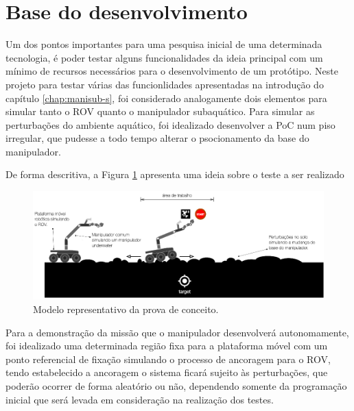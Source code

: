 \section{Base do desenvolvimento}
\label{sec:bod-s}
Um dos pontos importantes para uma pesquisa inicial de uma determinada tecnologia, é poder testar alguns funcionalidades da ideia principal com um mínimo de recursos necessários para o desenvolvimento de um protótipo. Neste projeto para testar várias das funcionlidades apresentadas na introdução do capítulo \ref{chap:manisub-s}, foi considerado analogamente dois elementos para simular tanto o ROV quanto o manipulador subaquático. Para simular as perturbações do ambiente aquático, foi idealizado desenvolver a PoC num piso irregular, que pudesse a todo tempo alterar o psocionamento da base do manipulador.

De forma descritiva, a Figura \ref{fig:manipoc} apresenta uma ideia sobre o teste a ser realizado

\begin{figure}[H] 
  \begin{center} 
  	\includegraphics[width=1 \textwidth]{images/ManiSub_PoC.png} 
  \end{center} 
  \caption{Modelo representativo da prova de conceito.} 
  \label{fig:manipoc} 
\end{figure}

Para a demonstração da missão que o manipulador desenvolverá autonomamente, foi idealizado uma determinada região fixa para a plataforma móvel com um ponto referencial de fixação simulando o processo de ancoragem para o ROV, tendo estabelecido a ancoragem o sistema ficará sujeito às perturbações, que poderão ocorrer de forma aleatório ou não, dependendo somente da programação inicial que será levada em consideração na realização dos testes.

